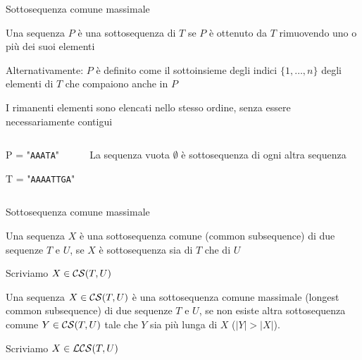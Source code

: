 \begin{frame}{Sottosequenza comune massimale}

\vspace{-9pt}
\begin{myboxtitle}
\BIL
\item Una sequenza $P$ è una \alert{sottosequenza} di $T$ se $P$ è ottenuto da $T$
rimuovendo uno o più dei suoi elementi
\item Alternativamente: $P$ è definito come il sottoinsieme degli indici $\{ 1, \ldots, n \}$
degli elementi di $T$ che compaiono anche in $P$
\item I rimanenti elementi sono elencati nello stesso ordine, senza essere necessariamente contigui
\EIL
\end{myboxtitle}

\vspace{-9pt}
\begin{columns}[T]
\begin{myboxtitle}[Esempi]
\BI
\item P = "\texttt{AAATA}"
\item T = "\texttt{\alert{AAA}AT\alert{T}G\alert{A}}"
\EI
\end{myboxtitle}
\begin{myboxtitle}[Note]
\smallskip
La sequenza vuota $\emptyset$ è sottosequenza di ogni altra sequenza
\end{myboxtitle}
\end{columns}

\end{frame}


\begin{frame}{Sottosequenza comune massimale}


\vspace{-9pt}
\begin{myboxtitle}
Una sequenza $X$ è una \alert{sottosequenza comune} (\alert{common subsequence}) di due sequenze $T$ e $U$, se $X$ è sottosequenza sia di $T$ che di $U$

\BIL
\item Scriviamo $X \in {\cal CS}(T,U)$
\EIL
\end{myboxtitle}

\begin{myboxtitle}
Una sequenza $X \in {\cal CS}(T,U)$ è una \alert{sottosequenza comune massimale} (\alert{longest common subsequence}) di due sequenze $T$ e $U$, se non esiste altra sottosequenza comune $Y \in {\cal CS}(T,U)$ tale che $Y$ sia più lunga di $X$ ($|Y|>|X|$).

\BIL
\item Scriviamo $X \in {\cal LCS}(T,U)$
\EIL
\end{myboxtitle}

\end{frame}


